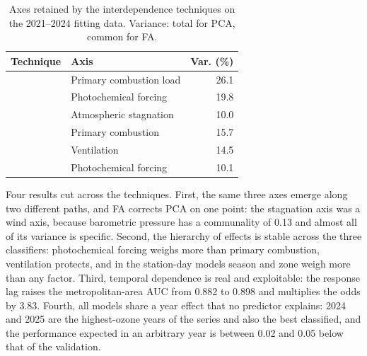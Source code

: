 \begin{table}[pos=t]
  \centering
  \caption{Axes retained by the interdependence techniques on the 2021--2024
    fitting data. Variance: total for PCA, common for FA.}
  \label{tab:resultados-ejes}
  \small
  \begin{tabular}{llr}
    \toprule
    Technique & Axis & Var. (\%) \\
    \midrule
      & Primary combustion load      & 26.1 \\
      & Photochemical forcing        & 19.8 \\
      & Atmospheric stagnation       & 10.0 \\
    \midrule
      & Primary combustion           & 15.7 \\
      & Ventilation                  & 14.5 \\
      & Photochemical forcing        & 10.1 \\
    \bottomrule
  \end{tabular}
\end{table}

Four results cut across the techniques. First, the same three axes emerge
along two different paths, and FA corrects PCA on one point: the stagnation
axis was a wind axis, because barometric pressure has a communality of 0.13
and almost all of its variance is specific. Second, the hierarchy of effects
is stable across the three classifiers: photochemical forcing weighs more
than primary combustion, ventilation protects, and in the station-day models
season and zone weigh more than any factor. Third, temporal dependence is
real and exploitable: the response lag raises the metropolitan-area AUC from
0.882 to 0.898 and multiplies the odds by 3.83. Fourth, all models share a
year effect that no predictor explains: 2024 and 2025 are the highest-ozone
years of the series and also the best classified, and the performance
expected in an arbitrary year is between 0.02 and 0.05 below that of the
validation.
